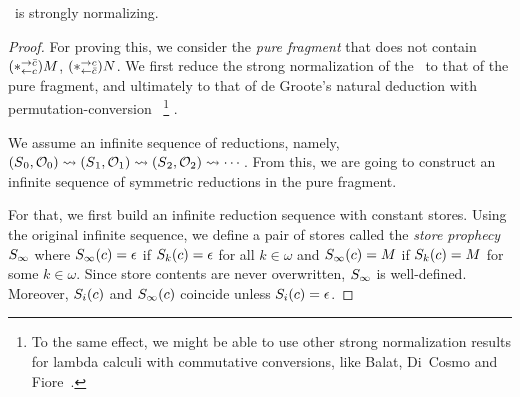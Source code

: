 \begin{theorem}
 \label{first:sn}
 \lgd\, is strongly normalizing.
\end{theorem}
\begin{proof}
For proving this, we consider the \textit{pure fragment}
 that does not contain
$(\ast^{\rightarrow {\bar{c}}}_{\leftarrow{c}})M$, $(\ast^{\rightarrow {c}}_{\leftarrow{\bar{c}}})N$.
We first reduce the strong
normalization of the \lgd\, to that of the pure fragment, and
ultimately to that of de Groote's
natural deduction with permutation-conversion~\cite{Philippe2002js}%
\footnote{
To the
same effect, we might be able to use other strong normalization
 results for lambda calculi with commutative conversions, like Balat,
 Di~Cosmo
 and Fiore~\cite{bdf}.
}%
.

We assume an infinite sequence of reductions, namely,
$
({S}{_0},{\mathcal{O}_0})
\rightsquigarrow
({S}{_1},{\mathcal{O}_1})
\rightsquigarrow
({S}{_2},{\mathcal{O}_2})
\rightsquigarrow\cdots
$.
From this, we are going to construct an infinite sequence of
symmetric reductions in the pure fragment.

For that, we first
build an infinite reduction sequence with constant stores.
Using the original infinite sequence, we define a pair of stores called the
\textit{store prophecy} ${S}_\infty$ where
$ {S}_\infty(c)= \epsilon$ if ${S}_k(c)=\epsilon$ for all
 $k\in\omega$ and
$ {S}_\infty(c)=M $ if ${S}_k(c)=M$ for some $k\in\omega$.
Since store contents are never overwritten,
${S}_\infty$ is well-defined.
Moreover,
${S}_i(c)$ and ${S}_\infty(c)$ coincide unless
${S}_i(c)=\epsilon$.


\end{proof}
